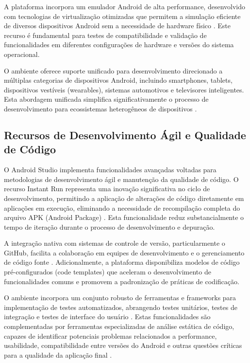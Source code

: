 \documentclass[
	12pt,				    %
	openright,			    %
	oneside,			    %
	a4paper,			    %
    sumario=tradicional,    %
	english,			    %
	brazil,				    %
	]{abntex2}              %
\begin{document}
A plataforma incorpora um emulador Android de alta performance, desenvolvido com tecnologias de virtualização otimizadas que permitem a simulação eficiente de diversos dispositivos Android sem a necessidade de hardware físico \cite{google2023emulator}. Este recurso é fundamental para testes de compatibilidade e validação de funcionalidades em diferentes configurações de hardware e versões do sistema operacional.

O ambiente oferece suporte unificado para desenvolvimento direcionado a múltiplas categorias de dispositivos Android, incluindo smartphones, tablets, dispositivos vestíveis (wearables), sistemas automotivos e televisores inteligentes. Esta abordagem unificada simplifica significativamente o processo de desenvolvimento para ecossistemas heterogêneos de dispositivos \cite{ableson2023multiplatform}.

\subsection{Recursos de Desenvolvimento Ágil e Qualidade de Código}

O Android Studio implementa funcionalidades avançadas voltadas para metodologias de desenvolvimento ágil e manutenção da qualidade de código. O recurso Instant Run representa uma inovação significativa no ciclo de desenvolvimento, permitindo a aplicação de alterações de código diretamente em aplicações em execução, eliminando a necessidade de recompilação completa do arquivo APK (Android Package) \cite{google2022instantrun}. Esta funcionalidade reduz substancialmente o tempo de iteração durante o processo de desenvolvimento e depuração.

A integração nativa com sistemas de controle de versão, particularmente o GitHub, facilita a colaboração em equipes de desenvolvimento e o gerenciamento de código fonte \cite{github2023integration}. Adicionalmente, a plataforma disponibiliza modelos de código pré-configurados (code templates) que aceleram o desenvolvimento de funcionalidades comuns e promovem a padronização de práticas de codificação.

O ambiente incorpora um conjunto robusto de ferramentas e frameworks para implementação de testes automatizados, abrangendo testes unitários, testes de integração e testes de interface do usuário \cite{junit2023android}. Estas funcionalidades são complementadas por ferramentas especializadas de análise estática de código, capazes de identificar potenciais problemas relacionados a performance, usabilidade, compatibilidade entre versões do Android e outras questões críticas para a qualidade da aplicação final \cite{android2023lint}.
\end{document}

